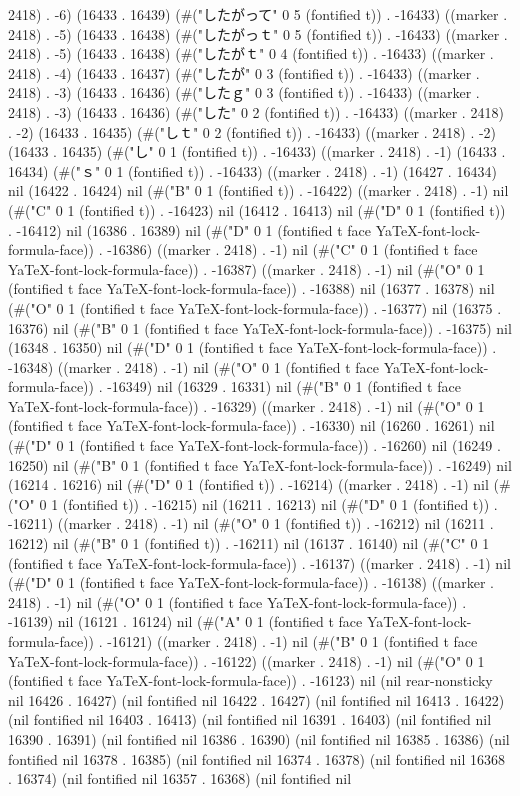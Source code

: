 2418) . -6) (16433 . 16439) (#("したがって" 0 5 (fontified t)) . -16433) ((marker . 2418) . -5) (16433 . 16438) (#("したがっｔ" 0 5 (fontified t)) . -16433) ((marker . 2418) . -5) (16433 . 16438) (#("したがｔ" 0 4 (fontified t)) . -16433) ((marker . 2418) . -4) (16433 . 16437) (#("したが" 0 3 (fontified t)) . -16433) ((marker . 2418) . -3) (16433 . 16436) (#("したｇ" 0 3 (fontified t)) . -16433) ((marker . 2418) . -3) (16433 . 16436) (#("した" 0 2 (fontified t)) . -16433) ((marker . 2418) . -2) (16433 . 16435) (#("しｔ" 0 2 (fontified t)) . -16433) ((marker . 2418) . -2) (16433 . 16435) (#("し" 0 1 (fontified t)) . -16433) ((marker . 2418) . -1) (16433 . 16434) (#("ｓ" 0 1 (fontified t)) . -16433) ((marker . 2418) . -1) (16427 . 16434) nil (16422 . 16424) nil (#("B" 0 1 (fontified t)) . -16422) ((marker . 2418) . -1) nil (#("C" 0 1 (fontified t)) . -16423) nil (16412 . 16413) nil (#("D" 0 1 (fontified t)) . -16412) nil (16386 . 16389) nil (#("D" 0 1 (fontified t face YaTeX-font-lock-formula-face)) . -16386) ((marker . 2418) . -1) nil (#("C" 0 1 (fontified t face YaTeX-font-lock-formula-face)) . -16387) ((marker . 2418) . -1) nil (#("O" 0 1 (fontified t face YaTeX-font-lock-formula-face)) . -16388) nil (16377 . 16378) nil (#("O" 0 1 (fontified t face YaTeX-font-lock-formula-face)) . -16377) nil (16375 . 16376) nil (#("B" 0 1 (fontified t face YaTeX-font-lock-formula-face)) . -16375) nil (16348 . 16350) nil (#("D" 0 1 (fontified t face YaTeX-font-lock-formula-face)) . -16348) ((marker . 2418) . -1) nil (#("O" 0 1 (fontified t face YaTeX-font-lock-formula-face)) . -16349) nil (16329 . 16331) nil (#("B" 0 1 (fontified t face YaTeX-font-lock-formula-face)) . -16329) ((marker . 2418) . -1) nil (#("O" 0 1 (fontified t face YaTeX-font-lock-formula-face)) . -16330) nil (16260 . 16261) nil (#("D" 0 1 (fontified t face YaTeX-font-lock-formula-face)) . -16260) nil (16249 . 16250) nil (#("B" 0 1 (fontified t face YaTeX-font-lock-formula-face)) . -16249) nil (16214 . 16216) nil (#("D" 0 1 (fontified t)) . -16214) ((marker . 2418) . -1) nil (#("O" 0 1 (fontified t)) . -16215) nil (16211 . 16213) nil (#("D" 0 1 (fontified t)) . -16211) ((marker . 2418) . -1) nil (#("O" 0 1 (fontified t)) . -16212) nil (16211 . 16212) nil (#("B" 0 1 (fontified t)) . -16211) nil (16137 . 16140) nil (#("C" 0 1 (fontified t face YaTeX-font-lock-formula-face)) . -16137) ((marker . 2418) . -1) nil (#("D" 0 1 (fontified t face YaTeX-font-lock-formula-face)) . -16138) ((marker . 2418) . -1) nil (#("O" 0 1 (fontified t face YaTeX-font-lock-formula-face)) . -16139) nil (16121 . 16124) nil (#("A" 0 1 (fontified t face YaTeX-font-lock-formula-face)) . -16121) ((marker . 2418) . -1) nil (#("B" 0 1 (fontified t face YaTeX-font-lock-formula-face)) . -16122) ((marker . 2418) . -1) nil (#("O" 0 1 (fontified t face YaTeX-font-lock-formula-face)) . -16123) nil (nil rear-nonsticky nil 16426 . 16427) (nil fontified nil 16422 . 16427) (nil fontified nil 16413 . 16422) (nil fontified nil 16403 . 16413) (nil fontified nil 16391 . 16403) (nil fontified nil 16390 . 16391) (nil fontified nil 16386 . 16390) (nil fontified nil 16385 . 16386) (nil fontified nil 16378 . 16385) (nil fontified nil 16374 . 16378) (nil fontified nil 16368 . 16374) (nil fontified nil 16357 . 16368) (nil fontified nil 